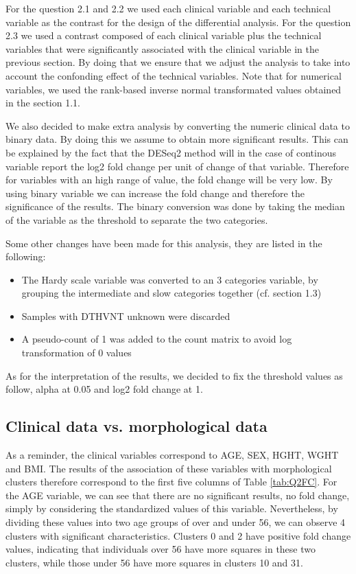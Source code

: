 \documentclass[a4paper, 11pt]{article}
\begin{document}
\begin{multicols}{2}
For the question 2.1 and 2.2 we used each clinical variable and each technical variable as the contrast for the design of the differential analysis.
For the question 2.3 we used a contrast composed of each clinical variable plus the technical variables that were significantly associated with the clinical variable in the previous section.
By doing that we ensure that we adjust the analysis to take into account the confonding effect of the technical variables.
Note that for numerical variables, we used the rank-based inverse normal transformated values obtained in the section 1.1.

We also decided to make extra analysis by converting the numeric clinical data to binary data. By doing this we assume to obtain more significant results. 
This can be explained by the fact that the DESeq2 method will in the case of continous variable report the log2 fold change per unit of change of that variable.
Therefore for variables with an high range of value, the fold change will be very low. By using binary variable we can increase the fold change and therefore the significance of the results.
The binary conversion was done by taking the median of the variable as the threshold to separate the two categories.

Some other changes have been made for this analysis, they are listed in the following:
\begin{itemize}
	\item  The Hardy scale variable was converted to an 3 categories variable, by grouping the intermediate and slow categories together (cf. section 1.3)
	\item  Samples with DTHVNT unknown were discarded
	\item  A pseudo-count of 1 was added to the count matrix to avoid log transformation of 0 values
\end{itemize}


As for the interpretation of the results, we decided to fix the threshold values as follow, alpha at 0.05 and log2 fold change at 1.


\subsection{Clinical data vs. morphological data}


As a reminder, the clinical variables correspond to AGE, SEX, HGHT, WGHT and BMI. The results of the association of these variables with morphological clusters therefore correspond to the first five columns of Table \ref{tab:Q2FC}.
For the AGE variable, we can see that there are no significant results, no fold change, simply by considering the standardized values of this variable. Nevertheless, by dividing these values into two age groups of over and under 56, we can observe 4 clusters with significant characteristics. Clusters 0 and 2 have positive fold change values, indicating that individuals over 56 have more squares in these two clusters, while those under 56 have more squares in clusters 10 and 31.


\end{multicols}
\end{document}

